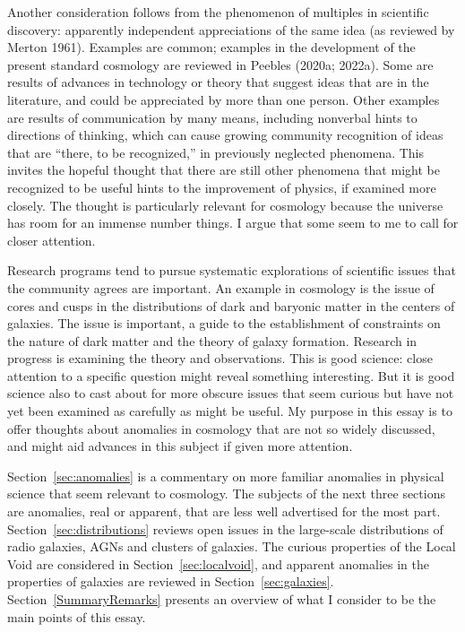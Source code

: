 \documentclass[fleqn,12pt]{article}
\begin{document}
Another consideration follows from the phenomenon of multiples in scientific discovery: apparently independent appreciations of the same idea (as reviewed by  Merton 1961). Examples are common; examples in the development of the present standard cosmology  are reviewed in Peebles (2020a; 2022a). Some are results of advances in technology or theory that suggest ideas that are in the literature, and could be appreciated by more than one person. Other examples are results of communication by many means, including  nonverbal hints to directions of thinking, which can cause growing community recognition of ideas that are ``there, to be recognized,'' in previously neglected phenomena. This invites the hopeful thought that there are still other phenomena that might be recognized to be useful hints to the improvement of physics, if examined more closely. The thought is particularly relevant for cosmology because the universe has room for an immense number things. I argue that some seem to me to call for closer attention. 

Research programs tend to pursue systematic explorations of scientific issues that the community agrees are important. An example in cosmology is the issue of cores and cusps in the distributions of dark and baryonic matter in the centers of galaxies. The issue is important, a guide to the establishment of constraints on the nature of dark matter and the theory of galaxy formation. Research in progress is examining the theory and observations. This is good science: close attention to a specific question might reveal something interesting. But it is good science also to cast about for more obscure issues that seem curious but have not yet been examined as carefully as might be useful. My purpose in this essay is to offer thoughts about anomalies in cosmology that are not so widely discussed, and might aid advances in this subject if given more attention. 

Section~\ref{sec:anomalies} is a commentary on more familiar anomalies in physical science that seem relevant to cosmology. The subjects of the next three sections are anomalies, real or apparent, that are less well advertised for the most part. Section~\ref{sec:distributions}  reviews open issues in the large-scale distributions of radio galaxies, AGNs and clusters of galaxies. The curious properties of the Local Void are considered in Section~\ref{sec:localvoid}, and apparent anomalies in the properties of galaxies are reviewed in Section~\ref{sec:galaxies}. Section~\ref{SummaryRemarks} presents an overview of what I consider to be the main points of this essay. 
\end{document}

